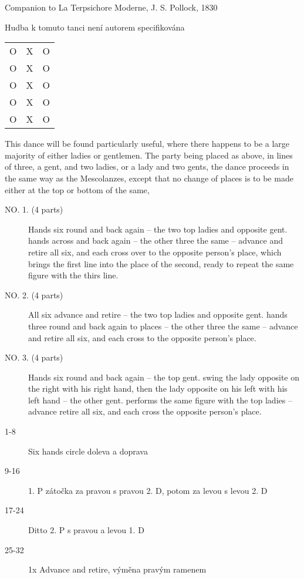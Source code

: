 
{\large\hfill Companion to La Terpsichore Moderne, J. S. Pollock, 1830}
\begin{center}
{\large Hudba k tomuto tanci není autorem specifikována}
\end{center}
\vspace{1em}
\HRule
\vspace{0.5em}
\begin{multicols}{2}
\begin{center}
\begin{tabular}{ c c c }
 O & X & O \\ 
 O & X & O \\ 
 O & X & O \\ 
 O & X & O \\ 
 O & X & O
\end{tabular}
\end{center}
This dance will be found particularly useful, where there happens to be a large majority of either ladies or gentlemen. The party being placed as above, in lines of three, a gent, and two ladies, or a lady and two gents, the dance proceeds in the same way as the Mescolanzes, except that no change of places is to be made either at the top or bottom of the same,

\columnbreak

\begin{description}
    \item[NO. 1. (4 parts)] Hands six round and back again -- the two top ladies and opposite gent. hands across and back again -- the other three the same -- advance and retire all six, and each cross over to the opposite person's place, which brings the first line into the place of the second, ready to repeat the same figure with the thirs line.
    \item[NO. 2. (4 parts)] All six advance and retire -- the two top ladies and opposite gent. hands three round and back again to places -- the other three the same -- advance and retire all six, and each cross to the opposite person's place.
    \item[NO. 3. (4 parts)] Hands six round and back again -- the top gent. swing the lady opposite on the right with his right hand, then the lady opposite on his left with his left hand -- the other gent. performs the same figure with the top ladies -- advance retire all six, and each cross the opposite person's place.
\end{description}
\end{multicols}
\vspace{1.5em}
\HRule
\HRule

\vspace{1.5em}
\begin{description}
    \item[1-8] Six hands circle doleva a doprava
    \item[9-16] 1. P zátočka za pravou s pravou 2. D, potom za levou s levou 2. D
    \item[17-24] Ditto 2. P s pravou a levou 1. D
    \item [25-32] 1x Advance and retire, výměna pravým ramenem
\end{description}